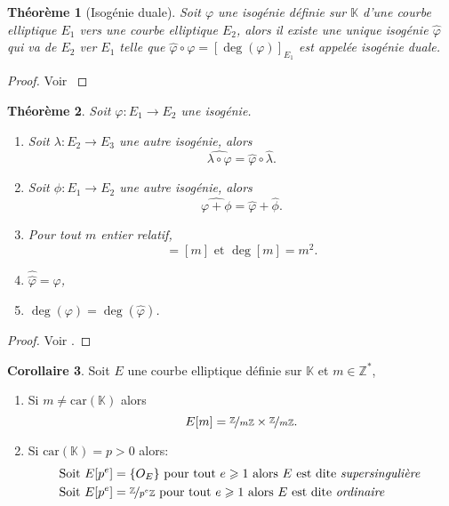 \documentclass[10pt,a4paper]{book}
\theoremstyle{plain}
\newtheorem{thm}{Théorème}[chapter]
\theoremstyle{definition}
\theoremstyle{definition}
\theoremstyle{definition}
\newtheorem{cor}[thm]{Corollaire}
\theoremstyle{definition}
\theoremstyle{definition}
\theoremstyle{remark}
\theoremstyle{remark}
\theoremstyle{definition}
\begin{document}
\begin{thm}[Isogénie duale]
Soit $\varphi$ une isogénie définie sur $\mathbb{K}$ d'une courbe elliptique 
$E_1$ vers une courbe elliptique $E_2$, alors il existe une unique isogénie 
$\widehat{\varphi}$ qui va de $E_2$ ver $E_1$ telle que $\widehat{\varphi}\circ
\varphi=[\deg(\varphi)]_{E_1}$ est appelée \emph{isogénie duale}.
\end{thm}

\begin{proof}
Voir \cite[III.6.1]{Silv1}
\end{proof}

\begin{thm}
Soit $\varphi:E_1 \rightarrow E_2$ une isogénie.
\begin{enumerate}
\item Soit $\lambda:E_2 \rightarrow E_3$ une autre isogénie, alors
\begin{equation*}
\widehat{\lambda \circ \varphi}= \widehat{\varphi} \circ \widehat{\lambda}.
\end{equation*} 
\item Soit $\phi:E_1 \rightarrow E_2$ une autre isogénie, alors
\begin{equation*}
\widehat{\varphi+\phi}=\widehat{\varphi}+\widehat{\phi}.
\end{equation*}
\item Pour tout $m$ entier relatif,
\begin{equation*}
[\widehat{m}]=[m] \text{ et } \deg[m]=m^2.
\end{equation*}
\item $\widehat{\widehat{\varphi}}=\varphi$,
\item $\deg(\varphi)=\deg(\widehat{\varphi})$.
\end{enumerate}
 
\end{thm}

\begin{proof}
Voir \cite[Theorem III.6.2]{Silv1}.
\end{proof}

\begin{cor}
Soit $E$ une courbe elliptique définie sur $\mathbb{K}$ et $m \in \mathbb{Z}^*$,
\begin{enumerate}
\item Si $m \neq \mathrm{car}(\mathbb{K})$ alors
\begin{equation*}
E[m]=\nicefrac{\mathbb{Z}}{m\mathbb{Z}} \times \nicefrac{\mathbb{Z}}{m\mathbb{Z}}. 
\end{equation*}
\item Si $\mathrm{car}(\mathbb{K})=p>0$ alors:
\begin{equation*}
\begin{alignedat}{1}
&\text{Soit } E[p^e]=\{O_E\} \text{ pour tout } e \geqslant 1 \text{ alors $E$ est dite \emph{supersingulière} }\\
&\text{Soit } E[p^e]=\nicefrac{\mathbb{Z}}{p^e\mathbb{Z}} \text{ pour tout } e \geqslant 1
\text{ alors $E$ est dite \emph{ordinaire} }\end{alignedat}
\end{equation*}
\end{enumerate}
\end{cor}
\end{document}
